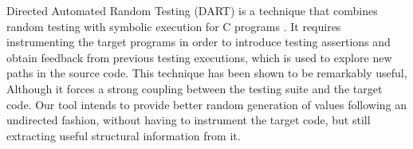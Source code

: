 %
%
Directed Automated Random Testing (DART) is a technique that combines random
testing with symbolic execution for C programs \cite{godefroid2005dart}.
%
It requires instrumenting the target programs in order to introduce testing
assertions and obtain feedback from previous testing executions, which is used
to explore new paths in the source code.
%
This technique has been shown to be remarkably useful, Although it forces a
strong coupling between the testing suite and the target code.
%
Our tool intends to provide better random generation of values following an
undirected fashion, without having to instrument the target code, but still
extracting useful structural information from it.
